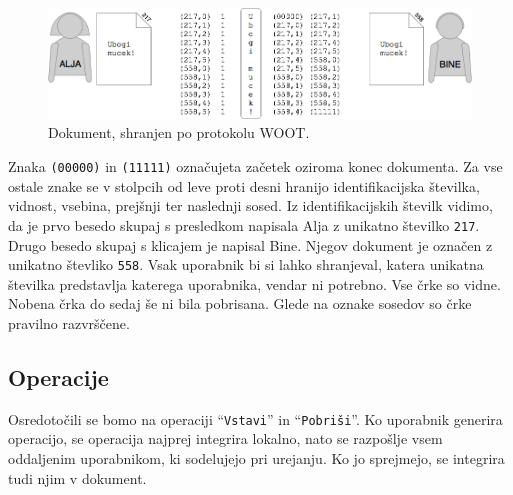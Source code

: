 \documentclass[a4paper, 12pt, twoside]{book}
\begin{document}
\begin{figure}[placement h]
\begin{center}
\includegraphics[width=13cm]{woot2.png}
\end{center}
\caption{Dokument, shranjen po protokolu WOOT.}
\label{woot2}
\end{figure}

Znaka {\tt (00000)} in {\tt (11111)} označujeta začetek oziroma konec dokumenta. Za vse ostale znake se v stolpcih od leve proti desni hranijo identifikacijska številka, vidnost, vsebina, prejšnji ter naslednji sosed. Iz identifikacijskih številk vidimo, da je prvo besedo skupaj s presledkom napisala Alja z unikatno številko {\tt 217}. Drugo besedo skupaj s klicajem je napisal Bine. Njegov dokument je označen z unikatno števliko {\tt 558}. Vsak uporabnik bi si lahko shranjeval, katera unikatna številka predstavlja katerega uporabnika, vendar ni potrebno. Vse črke so vidne. Nobena črka do sedaj še ni bila pobrisana. Glede na oznake sosedov so črke pravilno razvrščene.

\subsection{Operacije}

Osredotočili se bomo na operaciji “{\tt Vstavi}” in “{\tt Pobriši}”. Ko uporabnik generira operacijo, se operacija najprej integrira lokalno, nato se razpošlje vsem oddaljenim uporabnikom, ki sodelujejo pri urejanju. Ko jo sprejmejo, se integrira tudi njim v dokument.
\end{document}

